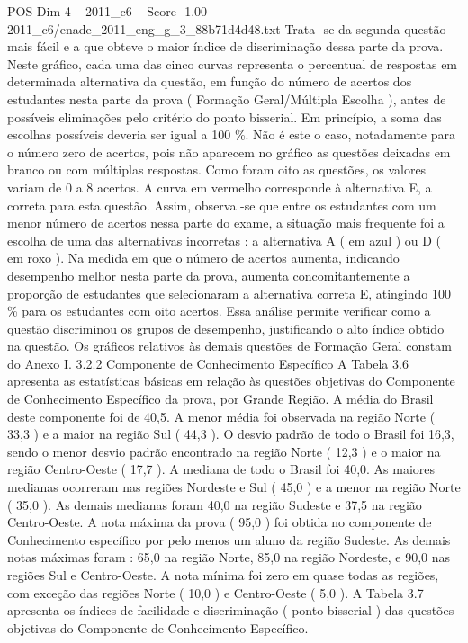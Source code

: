 \begin{textsample}{POS Dim 4 – 2011\_c6 – Score -1.00 – 2011\_c6/enade\_2011\_eng\_g\_3\_88b71d4d48.txt}
Trata -se da segunda questão mais fácil e a que obteve o maior índice de discriminação dessa parte da prova.
Neste gráfico, cada uma das cinco curvas representa o percentual de respostas em determinada alternativa da questão, em função do número de acertos dos estudantes nesta parte da prova ( Formação Geral/Múltipla Escolha ), antes de possíveis eliminações pelo critério do ponto bisserial.
Em princípio, a soma das escolhas possíveis deveria ser igual a 100 \%.
Não é este o caso, notadamente para o número zero de acertos, pois não aparecem no gráfico as questões deixadas em branco ou com múltiplas respostas.
Como foram oito as questões, os valores variam de 0 a 8 acertos.
A curva em vermelho corresponde à alternativa E, a correta para esta questão.
Assim, observa -se que entre os estudantes com um menor número de acertos nessa parte do exame, a situação mais frequente foi a escolha de uma das alternativas incorretas : a alternativa A ( em azul ) ou D ( em roxo ).
Na medida em que o número de acertos aumenta, indicando desempenho melhor nesta parte da prova, aumenta concomitantemente a proporção de estudantes que selecionaram a alternativa correta E, atingindo 100 \% para os estudantes com oito acertos.
Essa análise permite verificar como a questão discriminou os grupos de desempenho, justificando o alto índice obtido na questão.
Os gráficos relativos às demais questões de Formação Geral constam do Anexo I. 3.2.2 Componente de Conhecimento Específico A Tabela 3.6 apresenta as estatísticas básicas em relação às questões objetivas do Componente de Conhecimento Específico da prova, por Grande Região.
A média do Brasil deste componente foi de 40,5.
A menor média foi observada na região Norte ( 33,3 ) e a maior na região Sul ( 44,3 ).
O desvio padrão de todo o Brasil foi 16,3, sendo o menor desvio padrão encontrado na região Norte ( 12,3 ) e o maior na região Centro-Oeste ( 17,7 ).
A mediana de todo o Brasil foi 40,0.
As maiores medianas ocorreram nas regiões Nordeste e Sul ( 45,0 ) e a menor na região Norte ( 35,0 ).
As demais medianas foram 40,0 na região Sudeste e 37,5 na região Centro-Oeste.
A nota máxima da prova ( 95,0 ) foi obtida no componente de Conhecimento específico por pelo menos um aluno da região Sudeste.
As demais notas máximas foram : 65,0 na região Norte, 85,0 na região Nordeste, e 90,0 nas regiões Sul e Centro-Oeste.
A nota mínima foi zero em quase todas as regiões, com exceção das regiões Norte ( 10,0 ) e Centro-Oeste ( 5,0 ).
A Tabela 3.7 apresenta os índices de facilidade e discriminação ( ponto bisserial ) das questões objetivas do Componente de Conhecimento Específico.

\end{textsample}
